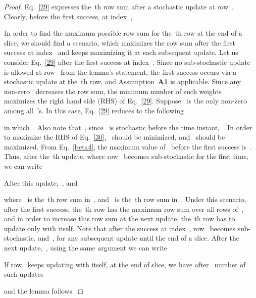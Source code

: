 \documentclass[draftclsnofoot, onecolumn, 12pt]{IEEEtran}
\begin{document}
\begin{proof}
Eq.~\eqref{29} expresses the~th row sum after a stochastic update at row~. Clearly, before the first success, at index~,

In order to find the maximum possible row sum for the~th row at the end of a slice, we should find a scenario, which maximizes the row sum after the first success at index~ and keeps maximizing it at each subsequent update. Let us consider Eq.~\eqref{29} after the first success at index~. Since no sub-stochastic update is allowed at row~ from the lemma's statement, the first success occurs via a stochastic update at the~th row, and Assumption~{\bf A1} is applicable. Since any non-zero~ decreases the row sum, the minimum number of such weights maximizes the right hand side (RHS) of Eq.~\eqref{29}. Suppose~ is the only non-zero among all~'s. In this case, Eq.~\eqref{29} reduces to the following

in which~. Also note that~, since~ is stochastic before the time instant,~. In order to maximize the RHS of Eq.~\eqref{30},~ should be minimized, and~ should be maximized. From Eq.~\eqref{beta4}, the maximum value of~ before the first success is~. Thus, after the~th update, where row~ becomes sub-stochastic for the first time, we can write

After this update,~, and

where~ is the~th row sum in~, and~ is the~th row sum in~.
Under this scenario, after the first success, the~th row has the maximum row sum over all rows of~, and in order to increase this row sum at the next update, the~th row has to update only with itself. Note that after the success at index~, row~ becomes sub-stochastic, and~, for any subsequent update until the end of a slice. After the next update,~, using the same argument we can write

If row~ keeps updating with itself, at the end of slice, we have after~ number of such updates

and the lemma follows.
\end{proof}
\end{document}
